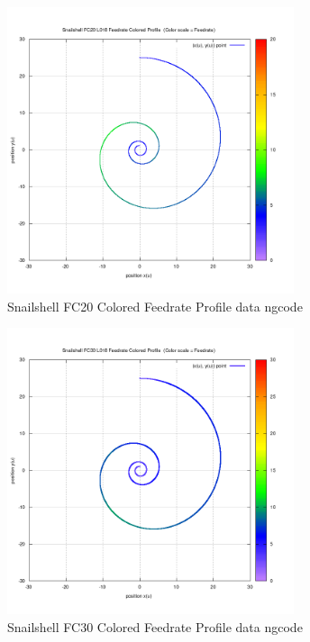 \begin{figure}
	\caption     {Snailshell FC20 Colored Feedrate Profile data ngcode}
	\label{18-img-Snailshell-FC20-Colored-Feedrate-Profile-data_ngcode.png}
	\includegraphics[width=0.75\textwidth]{Chap4/appendix/app-Snailshell/plots/18-img-Snailshell-FC20-Colored-Feedrate-Profile-data_ngcode.png}
\end{figure}

\clearpage
\pagebreak

\begin{figure}
	\caption     {Snailshell FC30 Colored Feedrate Profile data ngcode}
	\label{19-img-Snailshell-FC30-Colored-Feedrate-Profile-data_ngcode.png}
	\includegraphics[width=0.75\textwidth]{Chap4/appendix/app-Snailshell/plots/19-img-Snailshell-FC30-Colored-Feedrate-Profile-data_ngcode.png}
\end{figure}


